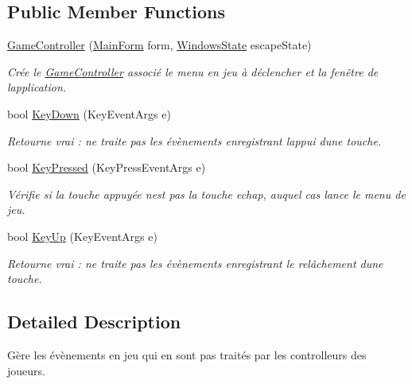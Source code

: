 \subsection*{Public Member Functions}
\begin{DoxyCompactItemize}
\item 
\hyperlink{class_tentacle_slicers_1_1inputs_1_1_game_controller_a7f6f576b5e9dbeb6ffabd2871f4bda49}{Game\+Controller} (\hyperlink{class_tentacle_slicers_1_1windows_1_1_main_form}{Main\+Form} form, \hyperlink{class_tentacle_slicers_1_1windows_1_1_windows_state}{Windows\+State} escape\+State)
\begin{DoxyCompactList}\small\item\em Crée le \hyperlink{class_tentacle_slicers_1_1inputs_1_1_game_controller}{Game\+Controller} associé le menu en jeu à déclencher et la fenêtre de l\textquotesingle{}application. \end{DoxyCompactList}\item 
bool \hyperlink{class_tentacle_slicers_1_1inputs_1_1_game_controller_ad2c4462255e76a592937943b437b865a}{Key\+Down} (Key\+Event\+Args e)
\begin{DoxyCompactList}\small\item\em Retourne vrai \+: ne traite pas les évènements enregistrant l\textquotesingle{}appui d\textquotesingle{}une touche. \end{DoxyCompactList}\item 
bool \hyperlink{class_tentacle_slicers_1_1inputs_1_1_game_controller_a5db759b0f19e3f8eaff1f0274c7042a5}{Key\+Pressed} (Key\+Press\+Event\+Args e)
\begin{DoxyCompactList}\small\item\em Vérifie si la touche appuyée n\textquotesingle{}est pas la touche echap, auquel cas lance le menu de jeu. \end{DoxyCompactList}\item 
bool \hyperlink{class_tentacle_slicers_1_1inputs_1_1_game_controller_ab01f8090801509068a02af3ad4ce19a1}{Key\+Up} (Key\+Event\+Args e)
\begin{DoxyCompactList}\small\item\em Retourne vrai \+: ne traite pas les évènements enregistrant le relâchement d\textquotesingle{}une touche. \end{DoxyCompactList}\end{DoxyCompactItemize}


\subsection{Detailed Description}
Gère les évènements en jeu qui en sont pas traités par les controlleurs des joueurs. 



